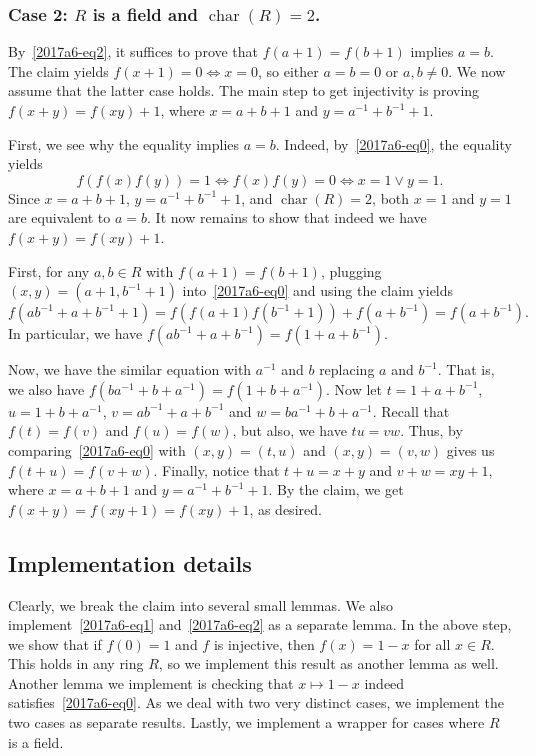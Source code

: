 \documentclass{article}
\DeclareMathOperator{\rchar}{char}
\begin{document}
\subsubsection*{Case 2: $R$ is a field and $\rchar(R) = 2$.}

By~\eqref{2017a6-eq2}, it suffices to prove that $f(a + 1) = f(b + 1)$ implies $a = b$.
The claim yields $f(x + 1) = 0 \iff x = 0$, so either $a = b = 0$ or $a, b \neq 0$.
We now assume that the latter case holds.
The main step to get injectivity is proving $f(x + y) = f(xy) + 1$, where $x = a + b + 1$ and $y = a^{-1} + b^{-1} + 1$.

First, we see why the equality implies $a = b$.
Indeed, by~\eqref{2017a6-eq0}, the equality yields
\[ f(f(x) f(y)) = 1 \iff f(x) f(y) = 0 \iff x = 1 \lor y = 1. \]
Since $x = a + b + 1$, $y = a^{-1} + b^{-1} + 1$, and $\rchar(R) = 2$, both $x = 1$ and $y = 1$ are equivalent to $a = b$.
It now remains to show that indeed we have $f(x + y) = f(xy) + 1$.

First, for any $a, b \in R$ with $f(a + 1) = f(b + 1)$, plugging $(x, y) = (a + 1, b^{-1} + 1)$ into~\eqref{2017a6-eq0} and using the claim yields
\[ f(ab^{-1} + a + b^{-1} + 1) = f(f(a + 1) f(b^{-1} + 1)) + f(a + b^{-1}) = f(a + b^{-1}). \]
In particular, we have $f(ab^{-1} + a + b^{-1}) = f(1 + a + b^{-1})$.

Now, we have the similar equation with $a^{-1}$ and $b$ replacing $a$ and $b^{-1}$.
That is, we also have $f(ba^{-1} + b + a^{-1}) = f(1 + b + a^{-1})$.
Now let $t = 1 + a + b^{-1}$, $u = 1 + b + a^{-1}$, $v = ab^{-1} + a + b^{-1}$ and $w = ba^{-1} + b + a^{-1}$.
Recall that $f(t) = f(v)$ and $f(u) = f(w)$, but also, we have $tu = vw$.
Thus, by comparing~\eqref{2017a6-eq0} with $(x, y) = (t, u)$ and $(x, y) = (v, w)$ gives us $f(t + u) = f(v + w)$.
Finally, notice that $t + u = x + y$ and $v + w = xy + 1$, where $x = a + b + 1$ and $y = a^{-1} + b^{-1} + 1$.
By the claim, we get $f(x + y) = f(xy + 1) = f(xy) + 1$, as desired.



\subsection*{Implementation details}

Clearly, we break the claim into several small lemmas.
We also implement~\eqref{2017a6-eq1} and~\eqref{2017a6-eq2} as a separate lemma.
In the above step, we show that if $f(0) = 1$ and $f$ is injective, then $f(x) = 1 - x$ for all $x \in R$.
This holds in any ring $R$, so we implement this result as another lemma as well.
Another lemma we implement is checking that $x \mapsto 1 - x$ indeed satisfies~\eqref{2017a6-eq0}.
As we deal with two very distinct cases, we implement the two cases as separate results.
Lastly, we implement a wrapper for cases where $R$ is a field.
\end{document}
